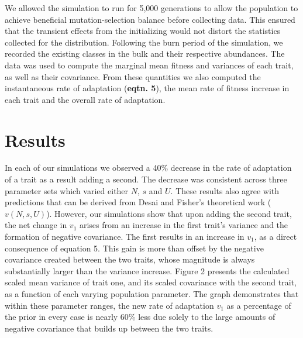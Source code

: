 \documentclass[11pt,twocolumn]{article}
\begin{document}
We allowed the simulation to run for 5,000 generations to allow the population to achieve beneficial mutation-selection balance before collecting data. This ensured that the transient effects from the initializing would not distort the statistics collected for the distribution. Following the burn period of the simulation, we recorded the existing classes in the bulk and their respective abundances. The data was used to compute the marginal mean fitness and variances of each trait, as well as their covariance. From these quantities we also computed the instantaneous rate of adaptation (\textbf{eqtn. 5}), the mean rate of fitness increase in each trait and the overall rate of adaptation.



\section{Results}
In each of our simulations we observed a 40\% decrease in the rate of adaptation of a trait as a result adding a second. The decrease was consistent across three parameter sets which varied either $N$, $s$ and $U$. These results also agree with predictions that can be derived from Desai and Fisher's theoretical work ($v(N,s,U)$). However, our simulations show that upon adding the second trait, the net change in $v_1$ arises from an increase in the first trait's variance and the formation of negative covariance. The first results in an increase in $v_1$, as a direct consequence of equation 5. This gain is more than offset by the negative covariance created between the two traits, whose magnitude is always substantially larger than the variance increase.  Figure 2 presents the calculated scaled mean variance of trait one, and its scaled covariance with the second trait, as a function of each varying population parameter. The graph demonstrates that within these parameter ranges, the new rate of adaptation $v_1$ as a percentage of the prior in every case is nearly 60\% less due solely to the large amounts of negative covariance that builds up between the two traits.\par
\end{document}
